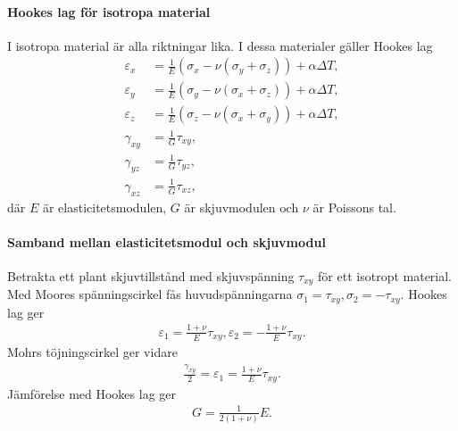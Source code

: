 \paragraph{Hookes lag för isotropa material}
I isotropa material är alla riktningar lika. I dessa materialer gäller Hookes lag
\begin{align*}
	\varepsilon_{x} &= \frac{1}{E}(\sigma_{x} - \nu(\sigma_{y} + \sigma_{z})) + \alpha\Delta T, \\
	\varepsilon_{y} &= \frac{1}{E}(\sigma_{y} - \nu(\sigma_{x} + \sigma_{z})) + \alpha\Delta T, \\
	\varepsilon_{z} &= \frac{1}{E}(\sigma_{z} - \nu(\sigma_{x} + \sigma_{y})) + \alpha\Delta T, \\
	\gamma_{xy}     &= \frac{1}{G}\tau_{xy}, \\
	\gamma_{yz}     &= \frac{1}{G}\tau_{yz}, \\
	\gamma_{xz}     &= \frac{1}{G}\tau_{xz},
\end{align*}
där $E$ är elasticitetsmodulen, $G$ är skjuvmodulen och $\nu$ är Poissons tal.

\paragraph{Samband mellan elasticitetsmodul och skjuvmodul}
Betrakta ett plant skjuvtillstånd med skjuvspänning $\tau_{xy}$ för ett isotropt material. Med Moores spänningscirkel fås huvudspänningarna $\sigma_{1} = \tau_{xy}, \sigma_{2} = -\tau_{xy}$. Hookes lag ger
\begin{align*}
	\varepsilon_{1} = \frac{1 + \nu}{E}\tau_{xy}, \varepsilon_{2} = -\frac{1 + \nu}{E}\tau_{xy}.
\end{align*}
Mohrs töjningscirkel ger vidare
\begin{align*}
	\frac{\gamma_{xy}}{2} = \varepsilon_{1} = \frac{1 + \nu}{E}\tau_{xy}.
\end{align*}
Jämförelse med Hookes lag ger
\begin{align*}
	G = \frac{1}{2(1 + \nu)}E.
\end{align*}